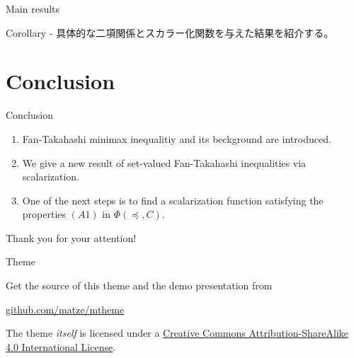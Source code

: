 \documentclass[aspectratio=169, dvipdfmx, 11pt]{beamer}
\begin{document}
\begin{frame}{Main results}
  \begin{block}{Corollary}
    - 具体的な二項関係とスカラー化関数を与えた結果を紹介する。
  \end{block}
\end{frame}

\section{Conclusion}

\begin{frame}{Conclusion}
  \begin{enumerate}
    \item Fan-Takahashi minimax inequalitiy and its beckground are introduced.
    \item We give a new result of set-valued Fan-Takahashi inequalities via scalarization.
    \item One of the next steps is to find a scalarization function satisfying the properties $(A1)$ in $\Phi(\preccurlyeq, C)$.
  \end{enumerate}
\end{frame}

\begin{frame}[allowframebreaks]
  \printbibliography
\end{frame}

\begin{frame}
  Thank you for your attention!
\end{frame}

\begin{frame}{Theme}

  Get the source of this theme and the demo presentation from

  \begin{center}\url{github.com/matze/mtheme}\end{center}

  The theme \emph{itself} is licensed under a
  \href{http://creativecommons.org/licenses/by-sa/4.0/}{Creative Commons
    Attribution-ShareAlike 4.0 International License}.

  \begin{center}\ccbysa\end{center}
\end{frame}
\end{document}
